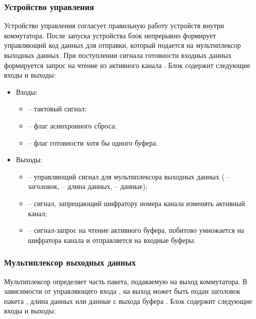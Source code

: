 \subsubsection{Устройство управления}

Устройство управления согласует правильную работу устройств внутри коммутатора. После запуска устройства блок непрерывно формирует управляющий код данных  для отправки, который подается на мультиплексор выходных данных. При поступлении сигнала готовности входных данных  формируется запрос на чтение из активного канала . Блок содержит следующие входы и выходы:

\begin{itemize}
	\item Входы:
	\begin{itemize}
		\item {} -- тактовый сигнал;
		\item {} -- флаг асинхронного сброса;
		\item {} -- флаг готовности хотя бы одного буфера.
	\end{itemize}
	\item Выходы:
	\begin{itemize}
		\item {} -- управляющий сигнал для мультиплексора выходных данных ( -- заголовок,  -- длина данных,  -- данные); 
		\item {} -- сигнал, запрещающий шифратору номера канала изменять активный канал;
		\item {} -- сигнал-запрос на чтение активного буфера, побитово умножается на  шифратора канала и отправляется на входные буферы.
	\end{itemize}
\end{itemize}

\subsubsection{Мультиплексор выходных данных}

Мультиплексор определяет часть пакета, подаваемую на выход коммутатора. В зависимости от управляющего входа , на выход может быть подан заголовок пакета , длина данных  или данные с выхода буфера . Блок содержит следующие входы и выходы:

